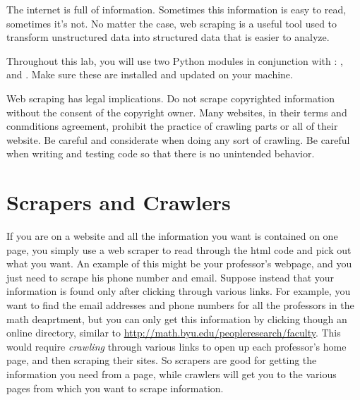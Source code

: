 \label{lab:Advanced_BS}

The internet is full of information.
Sometimes this information is easy to read, sometimes it's not.
No matter the case, web scraping is a useful tool used to transform unstructured data into structured data that is easier to analyze.

Throughout this lab, you will use two Python modules in conjunction with : , and .
Make sure these are installed and updated on your machine.

\begin{warn}
Web scraping has legal implications.
Do not scrape copyrighted information without the consent of the copyright owner.
Many websites, in their terms and conmditions agreement, prohibit the practice of crawling parts or all of their website.
Be careful and considerate when doing any sort of crawling.
Be careful when writing and testing code so that there is no unintended behavior.
\end{warn}

\section*{Scrapers and Crawlers}
If you are on a website and all the information you want is contained on one page, you simply use a web scraper to read through the html code and pick out what you want.
An example of this might be your professor's webpage, and you just need to scrape his phone number and email.
Suppose instead that your information is found only after clicking through various links.
For example, you want to find the email addresses and phone numbers for all the professors in the math deaprtment, but you can only get this information by clicking though an online directory, similar to \url{http://math.byu.edu/peopleresearch/faculty}.
This would require \textit{crawling} through various links to open up each professor's home page, and then scraping their sites.
So scrapers are good for getting the information you need from a page, while crawlers will get you to the various pages from which you want to scrape information.

